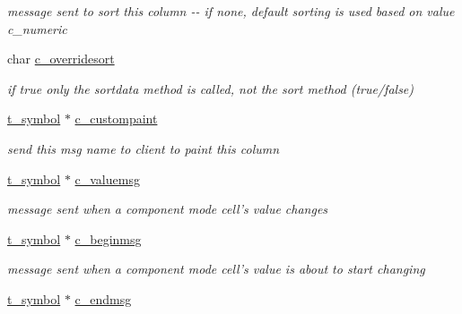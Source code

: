 \begin{DoxyCompactItemize}
\begin{DoxyCompactList}\small\item\em message sent to sort this column -\/-\/ if none, default sorting is used based on value c\_\-numeric \item\end{DoxyCompactList}\item 
\hypertarget{structt__jcolumn_aae13e35f98368d5a00a9d195c64f3180}{
char \hyperlink{structt__jcolumn_aae13e35f98368d5a00a9d195c64f3180}{c\_\-overridesort}}
\label{structt__jcolumn_aae13e35f98368d5a00a9d195c64f3180}

\begin{DoxyCompactList}\small\item\em if true only the sortdata method is called, not the sort method (true/false) \item\end{DoxyCompactList}\item 
\hypertarget{structt__jcolumn_a0b3f43a56d9025fbcd78984d35b4179f}{
\hyperlink{structt__symbol}{t\_\-symbol} $\ast$ \hyperlink{structt__jcolumn_a0b3f43a56d9025fbcd78984d35b4179f}{c\_\-custompaint}}
\label{structt__jcolumn_a0b3f43a56d9025fbcd78984d35b4179f}

\begin{DoxyCompactList}\small\item\em send this msg name to client to paint this column \item\end{DoxyCompactList}\item 
\hypertarget{structt__jcolumn_ab9605663a6507b5fd81ab19a9a181f8f}{
\hyperlink{structt__symbol}{t\_\-symbol} $\ast$ \hyperlink{structt__jcolumn_ab9605663a6507b5fd81ab19a9a181f8f}{c\_\-valuemsg}}
\label{structt__jcolumn_ab9605663a6507b5fd81ab19a9a181f8f}

\begin{DoxyCompactList}\small\item\em message sent when a component mode cell's value changes \item\end{DoxyCompactList}\item 
\hypertarget{structt__jcolumn_a5dfa904018c61d302a08483c1c7e513b}{
\hyperlink{structt__symbol}{t\_\-symbol} $\ast$ \hyperlink{structt__jcolumn_a5dfa904018c61d302a08483c1c7e513b}{c\_\-beginmsg}}
\label{structt__jcolumn_a5dfa904018c61d302a08483c1c7e513b}

\begin{DoxyCompactList}\small\item\em message sent when a component mode cell's value is about to start changing \item\end{DoxyCompactList}\item 
\hypertarget{structt__jcolumn_a57286ff374d90b7c4fec9219d3473fa5}{
\hyperlink{structt__symbol}{t\_\-symbol} $\ast$ \hyperlink{structt__jcolumn_a57286ff374d90b7c4fec9219d3473fa5}{c\_\-endmsg}}
\label{structt__jcolumn_a57286ff374d90b7c4fec9219d3473fa5}


\end{DoxyCompactItemize}
